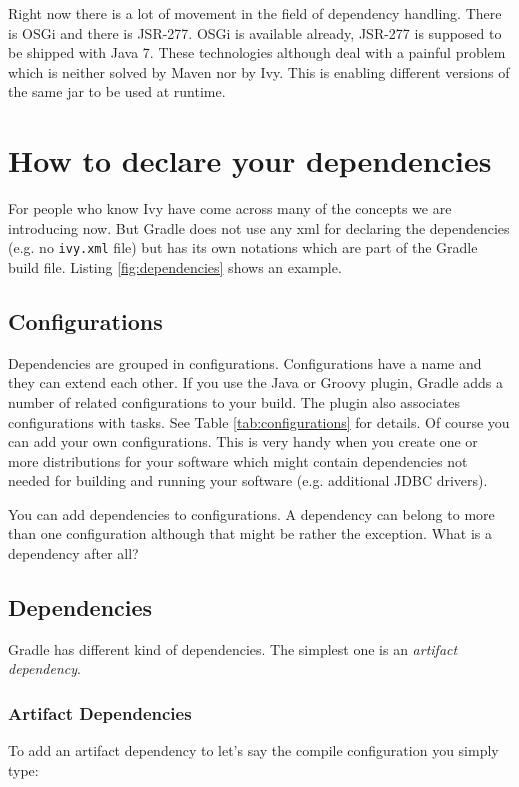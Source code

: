 Right now there is a lot of movement in the field of dependency handling. There is OSGi and there is JSR-277. OSGi is available already, JSR-277 is supposed to be shipped with Java 7. These technologies although deal with a painful problem which is neither solved by Maven nor by Ivy. This is enabling different versions of the same jar to be used at runtime.


\section{How to declare your dependencies} %
\label{sec:how_to_declare_your_dependencies}

For people who know Ivy have come across many of the concepts we are introducing now. But Gradle does not use any xml for declaring the dependencies (e.g. no \texttt{ivy.xml} file) but has its own notations which are part of the Gradle build file. Listing \ref{fig:dependencies} shows an example.

\subsection{Configurations} %
\label{sub:configurations}
Dependencies are grouped in configurations. Configurations have a name and they can extend each other. If you use the Java or Groovy plugin, Gradle adds a number of related configurations to your build. The plugin also associates configurations with tasks. See Table \ref{tab:configurations} for details. Of course you can add your own configurations. This is very handy when you create one or more distributions for your software which might contain dependencies not needed for building and running your software (e.g. additional JDBC drivers).

You can add dependencies to configurations. A dependency can belong to more than one configuration although that might be rather the exception. What is a dependency after all? 

\subsection{Dependencies} %
\label{sub:dependencies}
Gradle has different kind of dependencies. The simplest one is an \emph{artifact dependency}.
\subsubsection{Artifact Dependencies} %
\label{ssub:artifact_dependencies}
To add an artifact dependency to let's say the compile configuration you simply type:

